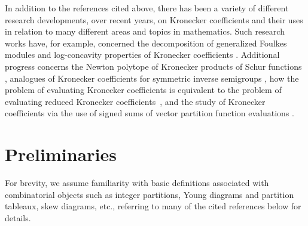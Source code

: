 \documentclass[12pt]{article}
\begin{document}
 In addition to the references cited above, there has been a variety of different research developments, over recent years, on Kronecker 
 coefficients and their uses in relation to many different areas and topics in mathematics. Such research works have, for example, 
 concerned the decomposition of generalized Foulkes modules \cite{HegedusMadireddi2025} and log-concavity properties of 
 Kronecker coefficients \cite{Gui2025}. Additional progress concerns the Newton polytope of Kronecker products of Schur functions 
 \cite{PanovaZhao2024,PanovaZhao2025}, analogues of Kronecker coefficients for symmetric inverse semigroups 
 \cite{MazorchukSrivastava2025}, how the problem of evaluating Kronecker coefficients is equivalent to the problem of evaluating 
 reduced Kronecker coefficients~\cite{IkenmeyerPanova2024,IkenmeyerPanova2024Sem}, and the study of Kronecker coefficients via the 
 use of signed sums of vector partition function evaluations \cite{MishnaTrandafir2024}. 

\section{Preliminaries}\label{secprelim}
 For brevity, we assume familiarity with basic definitions associated with combinatorial objects such as integer partitions, Young diagrams 
 and partition tableaux, skew diagrams, etc., referring to many of the cited references below for details. 
\end{document}
